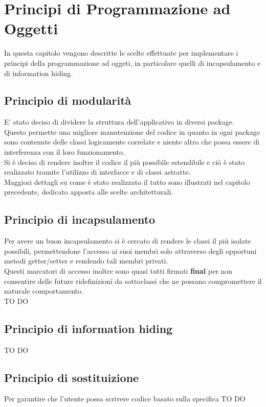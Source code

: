 % 
%
%

\section{Principi di Programmazione ad Oggetti}
In questa capitolo vengono descritte le scelte effettuate per implementare i principi della programmazione ad oggeti, in particolare quelli di incapsulamento e di information hiding. \\

	\subsection{Principio di modularità}
E' stato deciso di dividere la struttura dell'applicativo in diversi package. \\
Questo permette una migliore manutenzione del codice in quanto in ogni package sono contenute delle classi logicamente correlate e niente altro che possa essere di interferenza con il loro funzionamento. \\
Si è deciso di rendere inoltre il codice il più possibile estendibile e ciò è stato realizzato tramite l'utilizzo di interfacce e di classi astratte. \\
Maggiori dettagli su come è stato realizzato il tutto sono illustrati nel capitolo precedente, dedicato apposta alle scelte architetturali.

	\subsection{Principio di incapsulamento}
Per avere un buon incapsulamento si è cercato di rendere le classi il più isolate possibili, permettendone l'accesso ai suoi membri solo attraverso degli opportuni metodi getter/setter e rendendo tali membri privati. \\
Questi marcatori di accesso inoltre sono quasi tutti firmati \textbf{final} per non consentire delle future ridefinizioni da sottoclassi che ne possano compromettere il naturale comportamento. \\
TO DO
	\subsection{Principio di information hiding}
TO DO

	\subsection{Principio di sostituizione}
Per garantire che l'utente possa scrivere codice basato sulla specifica TO DO
